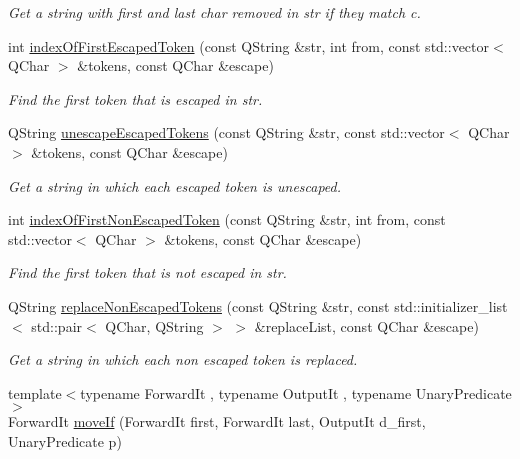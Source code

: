 \begin{DoxyCompactItemize}
\begin{DoxyCompactList}\small\item\em Get a string with first and last char removed in str if they match c. \end{DoxyCompactList}\item 
int \hyperlink{namespace_mdt_1_1_algorithm_ae8a2ca100d30dc1cded7ab19ce5c2b51}{index\+Of\+First\+Escaped\+Token} (const Q\+String \&str, int from, const std\+::vector$<$ Q\+Char $>$ \&tokens, const Q\+Char \&escape)
\begin{DoxyCompactList}\small\item\em Find the first token that is escaped in str. \end{DoxyCompactList}\item 
Q\+String \hyperlink{namespace_mdt_1_1_algorithm_a14e6be0f9146fc0057fa9fc60d949103}{unescape\+Escaped\+Tokens} (const Q\+String \&str, const std\+::vector$<$ Q\+Char $>$ \&tokens, const Q\+Char \&escape)
\begin{DoxyCompactList}\small\item\em Get a string in which each escaped token is unescaped. \end{DoxyCompactList}\item 
int \hyperlink{namespace_mdt_1_1_algorithm_a54f6c69ceeb42533f944b1ef3ec12039}{index\+Of\+First\+Non\+Escaped\+Token} (const Q\+String \&str, int from, const std\+::vector$<$ Q\+Char $>$ \&tokens, const Q\+Char \&escape)
\begin{DoxyCompactList}\small\item\em Find the first token that is not escaped in str. \end{DoxyCompactList}\item 
Q\+String \hyperlink{namespace_mdt_1_1_algorithm_a8b0ccb2dc438ae3e379dc080ceb2edc7}{replace\+Non\+Escaped\+Tokens} (const Q\+String \&str, const std\+::initializer\+\_\+list$<$ std\+::pair$<$ Q\+Char, Q\+String $>$ $>$ \&replace\+List, const Q\+Char \&escape)
\begin{DoxyCompactList}\small\item\em Get a string in which each non escaped token is replaced. \end{DoxyCompactList}\item 
{\footnotesize template$<$typename Forward\+It , typename Output\+It , typename Unary\+Predicate $>$ }\\Forward\+It \hyperlink{namespace_mdt_1_1_algorithm_a1f739be25cc7de2c30a21b85d9b25f0a}{move\+If} (Forward\+It first, Forward\+It last, Output\+It d\+\_\+first, Unary\+Predicate p)

\end{DoxyCompactItemize}
